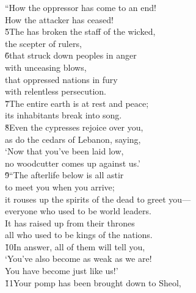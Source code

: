 \begin{poetry}
\poeml ``How the oppressor has come to an end! \\
\poemll    How the attacker has ceased! \\
\poeml \v{5}The  has broken the staff of the wicked, \\
\poemll    the scepter of rulers, \\
\poeml \v{6}that struck down peoples in anger \\
\poemll    with unceasing blows, \\
\poeml that oppressed nations in fury \\
\poemll    with relentless persecution. \\
\poeml \v{7}The entire earth is at rest and peace; \\
\poemll    its inhabitants break into song. \\
\poeml \v{8}Even the cypresses rejoice over you, \\
\poemll    as do the cedars of Lebanon, saying, \\
\poeml `Now that you've been laid low, \\
\poemll    no woodcutter comes up against us.' \\
\poeml \v{9}``The afterlife below is all astir \\
\poemll    to meet you when you arrive; \\
\poeml it rouses up the spirits of the dead to greet you--- \\
\poemll    everyone who used to be world leaders. \\
\poeml It has raised up from their thrones \\
\poemll    all who used to be kings of the nations. \\
\poeml \v{10}In answer, all of them will tell you, \\
\poemll    `You've also become as weak as we are! \\
\poeml You have become just like us!' \\
\poeml \v{11}Your pomp has been brought down to Sheol, \\

\end{poetry}

